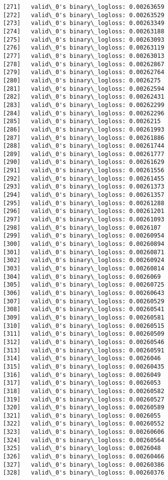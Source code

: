 \documentclass[11pt]{article}
\begin{document}
\begin{Verbatim}[commandchars=\\\{\}]
[271]	valid\_0's binary\_logloss: 0.00263659
[272]	valid\_0's binary\_logloss: 0.00263529
[273]	valid\_0's binary\_logloss: 0.00263349
[274]	valid\_0's binary\_logloss: 0.00263188
[275]	valid\_0's binary\_logloss: 0.00263093
[276]	valid\_0's binary\_logloss: 0.00263119
[277]	valid\_0's binary\_logloss: 0.00263013
[278]	valid\_0's binary\_logloss: 0.00262867
[279]	valid\_0's binary\_logloss: 0.00262764
[280]	valid\_0's binary\_logloss: 0.0026275
[281]	valid\_0's binary\_logloss: 0.00262594
[282]	valid\_0's binary\_logloss: 0.00262431
[283]	valid\_0's binary\_logloss: 0.00262299
[284]	valid\_0's binary\_logloss: 0.00262296
[285]	valid\_0's binary\_logloss: 0.0026215
[286]	valid\_0's binary\_logloss: 0.00261993
[287]	valid\_0's binary\_logloss: 0.00261886
[288]	valid\_0's binary\_logloss: 0.00261744
[289]	valid\_0's binary\_logloss: 0.00261777
[290]	valid\_0's binary\_logloss: 0.00261629
[291]	valid\_0's binary\_logloss: 0.00261556
[292]	valid\_0's binary\_logloss: 0.00261455
[293]	valid\_0's binary\_logloss: 0.00261373
[294]	valid\_0's binary\_logloss: 0.00261357
[295]	valid\_0's binary\_logloss: 0.00261288
[296]	valid\_0's binary\_logloss: 0.00261201
[297]	valid\_0's binary\_logloss: 0.00261093
[298]	valid\_0's binary\_logloss: 0.0026107
[299]	valid\_0's binary\_logloss: 0.00260954
[300]	valid\_0's binary\_logloss: 0.00260894
[301]	valid\_0's binary\_logloss: 0.00260871
[302]	valid\_0's binary\_logloss: 0.00260924
[303]	valid\_0's binary\_logloss: 0.00260814
[304]	valid\_0's binary\_logloss: 0.0026069
[305]	valid\_0's binary\_logloss: 0.00260725
[306]	valid\_0's binary\_logloss: 0.00260643
[307]	valid\_0's binary\_logloss: 0.00260529
[308]	valid\_0's binary\_logloss: 0.00260541
[309]	valid\_0's binary\_logloss: 0.00260581
[310]	valid\_0's binary\_logloss: 0.00260515
[311]	valid\_0's binary\_logloss: 0.00260509
[312]	valid\_0's binary\_logloss: 0.00260546
[313]	valid\_0's binary\_logloss: 0.00260591
[314]	valid\_0's binary\_logloss: 0.0026046
[315]	valid\_0's binary\_logloss: 0.00260435
[316]	valid\_0's binary\_logloss: 0.0026049
[317]	valid\_0's binary\_logloss: 0.0026053
[318]	valid\_0's binary\_logloss: 0.00260582
[319]	valid\_0's binary\_logloss: 0.00260527
[320]	valid\_0's binary\_logloss: 0.00260589
[321]	valid\_0's binary\_logloss: 0.0026055
[322]	valid\_0's binary\_logloss: 0.00260552
[323]	valid\_0's binary\_logloss: 0.00260606
[324]	valid\_0's binary\_logloss: 0.00260564
[325]	valid\_0's binary\_logloss: 0.0026048
[326]	valid\_0's binary\_logloss: 0.00260466
[327]	valid\_0's binary\_logloss: 0.00260386
[328]	valid\_0's binary\_logloss: 0.00260376

\end{Verbatim}
\end{document}
